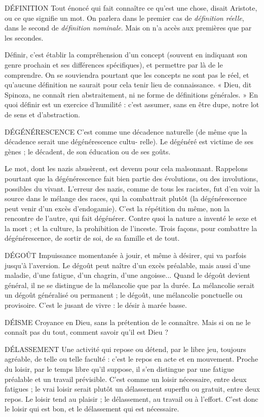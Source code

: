 DÉFINITION Tout énoncé qui fait connaître ce qu’est une chose, disait
Aristote, ou ce que signifie un mot. On parlera dans le premier
cas de {\it définition réelle}, dans le second de {\it définition nominale}. Mais on n’a
accès aux premières que par les secondes.

Définir, c’est établir la compréhension d’un concept (souvent en indiquant
son genre prochain et ses différences spécifiques), et permettre par là de le comprendre.
On se souviendra pourtant que les concepts ne sont pas le réel, et
qu'aucune définition ne saurait pour cela tenir lieu de connaissance. « Dieu, dit
Spinoza, ne connaît rien abstraitement, ni ne forme de définitions générales. »
En quoi définir est un exercice d’humilité : c’est assumer, sans en être dupe,
notre lot de sens et d’abstraction.

DÉGÉNÉRESCENCE C’est comme une décadence naturelle (de même
que la décadence serait une dégénérescence cultu-
relle). Le dégénéré est victime de ses gènes ; le décadent, de son éducation ou
de ses goûts.

Le mot, dont les nazis abusèrent, est devenu pour cela malsonnant. Rappelons
pourtant que la dégénérescence fait bien partie des évolutions, ou des
involutions, possibles du vivant. L'erreur des nazis, comme de tous les racistes,
fut d’en voir la source dans le mélange des races, qui la combattrait plutôt (la
dégénérescence peut venir d’un excès d’endogamie). C’est la répétition du
même, non la rencontre de l’autre, qui fait dégénérer. Contre quoi la nature a
inventé le sexe et la mort ; et la culture, la prohibition de l’inceste. Trois façons,
pour combattre la dégénérescence, de sortir de soi, de sa famille et de tout.

DÉGOÛT Impuissance momentanée à jouir, et même à désirer, qui va
parfois jusqu’à l’aversion. Le dégoût peut naître d’un excès préalable,
mais aussi d’une maladie, d’une fatigue, d’un chagrin, d’une angoisse...
Quand le dégoût devient général, il ne se distingue de la mélancolie que par la
durée. La mélancolie serait un dégoût généralisé ou permanent ; le dégoût, une
mélancolie ponctuelle ou provisoire. C’est le jusant de vivre : le désir à marée
basse.

DÉISME  Croyance en Dieu, sans la prétention de le connaître. Mais si on
ne le connaît pas du tout, comment savoir qu’il est Dieu ?

DÉLASSEMENT Une activité qui repose ou détend, par le libre jeu, toujours
agréable, de telle ou telle faculté : c’est le repos en
acte et en mouvement. Proche du loisir, par le temps libre qu’il suppose, il s’en
distingue par une fatigue préalable et un travail prévisible. C’est comme un
loisir nécessaire, entre deux fatigues ; le vrai loisir serait plutôt un délassement
superflu ou gratuit, entre deux repos. Le loisir tend au plaisir ; le délassement,
au travail ou à l’effort. C’est donc le loisir qui est bon, et le délassement qui est
nécessaire.

